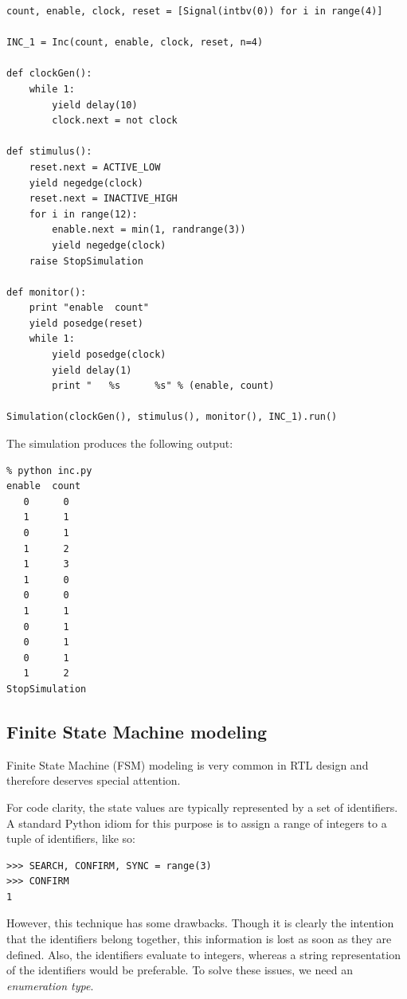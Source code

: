 \begin{verbatim}
count, enable, clock, reset = [Signal(intbv(0)) for i in range(4)]

INC_1 = Inc(count, enable, clock, reset, n=4)

def clockGen():
    while 1:
        yield delay(10)
        clock.next = not clock

def stimulus():
    reset.next = ACTIVE_LOW
    yield negedge(clock)
    reset.next = INACTIVE_HIGH
    for i in range(12):
        enable.next = min(1, randrange(3))
        yield negedge(clock)
    raise StopSimulation

def monitor():
    print "enable  count"
    yield posedge(reset)
    while 1:
        yield posedge(clock)
        yield delay(1)
        print "   %s      %s" % (enable, count)
        
Simulation(clockGen(), stimulus(), monitor(), INC_1).run()
\end{verbatim}

The simulation produces the following output:
\begin{verbatim}
% python inc.py
enable  count
   0      0
   1      1
   0      1
   1      2
   1      3
   1      0
   0      0
   1      1
   0      1
   0      1
   0      1
   1      2
StopSimulation
\end{verbatim}


\subsection{Finite State Machine modeling \label{model-fsm}}

Finite State Machine (FSM) modeling is very common in RTL
design and therefore deserves special attention.

For code clarity, the state values are typically represented by a set
of identifiers. A standard Python idiom for this purpose is to assign
a range of integers to a tuple of identifiers, like so:

\begin{verbatim}
>>> SEARCH, CONFIRM, SYNC = range(3)
>>> CONFIRM
1
\end{verbatim}

However, this technique has some drawbacks. Though it is clearly
the intention that the identifiers belong together, this information
is lost as soon as they are defined. Also, the identifiers evaluate to
integers, whereas a string representation of the identifiers
would be preferable. To solve these issues, we need an
\emph{enumeration type}.

